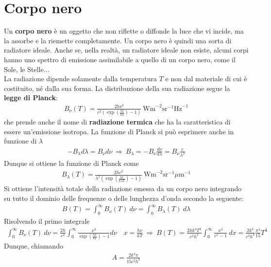 \documentclass[a4paper, oneside]{book}
\begin{document}
\section{Corpo nero}
Un \textbf{corpo nero} è un oggetto che non riflette o diffonde la luce che vi incide, ma
la assorbe e la riemette completamente. Un corpo nero è quindi una sorta di radiatore ideale.
Anche se, nella realtà, un radiatore ideale non esiste, alcuni corpi hanno uno spettro di 
emissione assimilabile a quello di un corpo nero, come il Sole, le Stelle...  \\ \noindent
La radiazione dipende solamente dalla temperatura $T$ e non dal materiale di cui 
è costituito, né dalla sua forma. La distribuzione della sua radiazione segue la \textbf{legge di Planck}:
\begin{align}
    B_\nu(T) = \frac{2h\nu^{3}}{c^{2}\left(\exp\left(\frac{h\nu}{kT}\right) - 1\right)} \ \text{Wm}^{-2}\text{sr}^{-1}\text{Hz}^{-1}
\end{align}
che prende anche il nome di \textbf{radiazione termica} che ha la caratteristica di essere un'emissione isotropa. La funzione di Planck
si può esprimere anche in funzione di $\lambda$ 
\begin{gather*}
    -B_\lambda d\lambda = B_\nu d\nu \ \Longrightarrow \ B_\lambda = -B_\nu \frac{d\nu}{d\lambda} = B_\nu \frac{c}{\lambda^{2}}
\end{gather*}
Dunque si ottiene la funzione di Planck come 
\begin{align}
    B_\lambda(T) = \frac{2hc^{2}}{\lambda^{5} \left(\exp\left(\frac{hc}{k\lambda T}\right) - 1\right)} \ \text{Wm}^{-2}\text{sr}^{-1}\mu\text{m}^{-1}
\end{align}
Si ottiene l'intensità totale della radiazione emessa da un corpo nero integrando su tutto il dominio delle
frequenze o delle lunghezza d'onda secondo la seguente:
\begin{align}
    B(T) = \int_{0}^{\infty } B_\nu(T) \ d\nu = \int_{0}^{\infty }B_\lambda (T) \ d\lambda 
\end{align}
Risolvendo il primo integrale
\begin{gather*}
    \int_{0}^{\infty }B_\nu(T) \ d\nu = \frac{2h}{c^{2}}\int_{0}^{\infty }\frac{\nu^{3}}{\exp\left(\frac{h\nu}{kT}\right) - 1} d\nu \quad x = \frac{h\nu}{kT} \ \Longrightarrow \ B(T) = \frac{2hk^{4}T^{4}}{c^{2}h^{4}} \int_{0}^{\infty } \frac{x^{3}}{e^{x} - 1} \ dx  = \frac{2k^{4}}{c^{2}h^{3}} \frac{\pi^{4}}{15}T^{4}
\end{gather*}
Dunque, chiamando 
\begin{gather*}
    A = \frac{2k^{4}\pi}{15c^{2}h^{3}}
\end{gather*}
\end{document}
